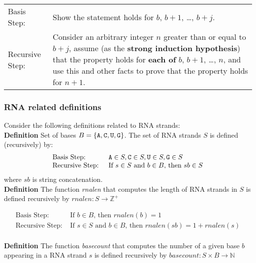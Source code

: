 \documentclass[12pt, oneside]{article}
\begin{document}
\begin{tabularx}{\textwidth}{l X}
    Basis Step: & Show the statement holds for $b$, $b+1$, \ldots, $b+j$. \\
    Recursive Step: & Consider an arbitrary integer $n$ greater than or  equal to  $b+j$, assume
    (as the {\bf strong  induction hypothesis})  that the property holds  for {\bf each of} $b$, $b+1$, \ldots, $n$, 	
    and use  this and
    other facts to  prove that  the property holds for $n+1$.
\end{tabularx}
\newpage

\newpage


\subsubsection*{RNA related definitions}

Consider the following definitions related to RNA strands:\\

{\bf Definition} Set of bases $B  =  \{ \texttt{A}, \texttt{C}, \texttt{U}, \texttt{G} \}$. The set of RNA strands $S$ is defined (recursively) by:
\[
\begin{array}{ll}
\textrm{Basis Step: } & \texttt{A} \in S, \texttt{C} \in S, \texttt{U} \in S, \texttt{G} \in S \\
\textrm{Recursive Step: } & \textrm{If } s \in S\textrm{ and }b \in B \textrm{, then }sb \in S
\end{array}
\]
where $sb$ is string concatenation. \\

{\bf Definition} The function \textit{rnalen} that computes the length of RNA strands in $S$ is defined recursively by
$rnalen: S  \to \mathbb{Z}^+$

\[
\begin{array}{ll}
\textrm{Basis Step: } &  \textrm{If } b \in B \textrm{, then } rnalen(b)  = 1\\

\textrm{Recursive Step: } & \textrm{If } s \in S \textrm{ and } b \in B \textrm{, then } rnalen(sb)  = 1 + rnalen(s)\\
\end{array}
\]

{\bf Definition} The function \textit{basecount} that computes the number of a given base $b$ appearing in a RNA strand $s$ is defined recursively by $basecount : S \times B \to\mathbb{N}$
\end{document}
